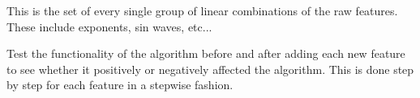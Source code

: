 \documentclass[12pt]{article}
\begin{document}
\begin{enumerate}

This is the set of every single group of linear combinations of the raw features. These include exponents, sin waves, etc...


Test the functionality of the algorithm before and after adding each new feature to see whether it positively or negatively affected the algorithm. This is done step by step for each feature in a stepwise fashion. 

\end{enumerate}



\end{document}
